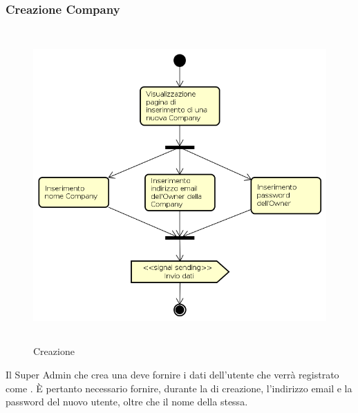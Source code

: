 \subsubsection{Creazione Company}
\begin{figure}[H]
\begin{center}
\includegraphics[height=12cm]{res/sections/backend/activities/creazioneCompanySA.png}
\caption{Creazione }
\end{center}
\end{figure}
Il Super Admin che crea una  deve fornire i dati dell'utente che verrà registrato come . È pertanto necessario fornire, durante la  di creazione, l'indirizzo email e la password del nuovo utente, oltre che il nome della  stessa.
